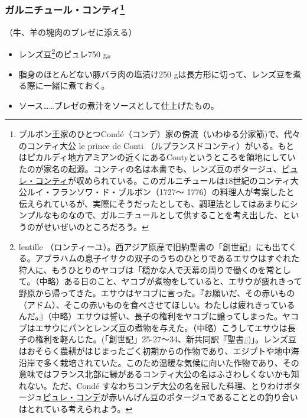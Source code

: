 \begin{recette}
\hypertarget{garniture-conti}{%
\subsubsection[ガルニチュール・コンティ]{\texorpdfstring{ガルニチュール・コンティ\footnote{ブルボン王家のひとつCondé（コンデ）家の傍流（いわゆる分家筋)で、代々のコンティ大公
  le prince de Conti
  （ルプランスドコンティ）がいる。もとはピカルディ地方アミアンの近くにあるContyというところを領地にしていたのが家名の起源。コンティの名は本書でも、レンズ豆のポタージュ、\protect\hyperlink{puree-conti}{ピュレ・コンティ}が収められている。このガルニチュールは18世紀のコンティ大公ルイ・フランソワ・ド・ブルボン（1727〜
  1776）の料理人が考案したと伝えられているが、実際にそうだったとしても、調理法としてはあまりにシンプルなものなので、ガルニチュールとして供することを考え出した、というのがせいぜいのところだろう。}}{ガルニチュール・コンティ}}\label{garniture-conti}}



（牛、羊の塊肉のブレゼに添える）

\begin{itemize}
\item
  レンズ豆\footnote{lentille
    （ロンティーユ）。西アジア原産で旧約聖書の「創世記」にも出てくる。アブラハムの息子イサクの双子のうちのひとりであるエサウはすぐれた狩人に、もうひとりのヤコブは「穏かな人で天幕の周りで働くのを常として。（中略）ある日のこと、ヤコブが煮物をしていると、エサウが疲れきって野原から帰ってきた。エサウはヤコブに言った。『お願いだ、その赤いもの（アドム）、そこの赤いものを食べさせてほしい。わたしは疲れきっているんだ。』（中略）エサウは誓い、長子の権利をヤコブに譲ってしまった。ヤコブはエサウにパンとレンズ豆の煮物を与えた。（中略）こうしてエサウは長子の権利を軽んじた。(「創世記」25-27〜34、新共同訳『聖書』)」。レンズ豆はおそらく農耕がはじまったごく初期からの作物であり、エジプトや地中海沿岸で多く栽培されていた。このため温暖な気候に向いた作物であり、その意味ではフランス北部に縁があるコンティ大公の名はふさわしくないかも知れない。ただ、Condé
    すなわちコンデ大公の名を冠した料理、とりわけポタージュ\protect\hyperlink{puree-conde}{ピュレ・コンデ}が赤いんげん豆のポタージュであることとの釣り合いはとれている考えられよう。}のピュレ750
  g。
\item
  脂身のほとんどない豚バラ肉の塩漬け250
  gは長方形に切って、レンズ豆を煮る際に一緒に煮ておく。
\item
  ソース\ldots{}\ldots{}ブレゼの煮汁をソースとして仕上げたもの。
\end{itemize}


\end{recette}
